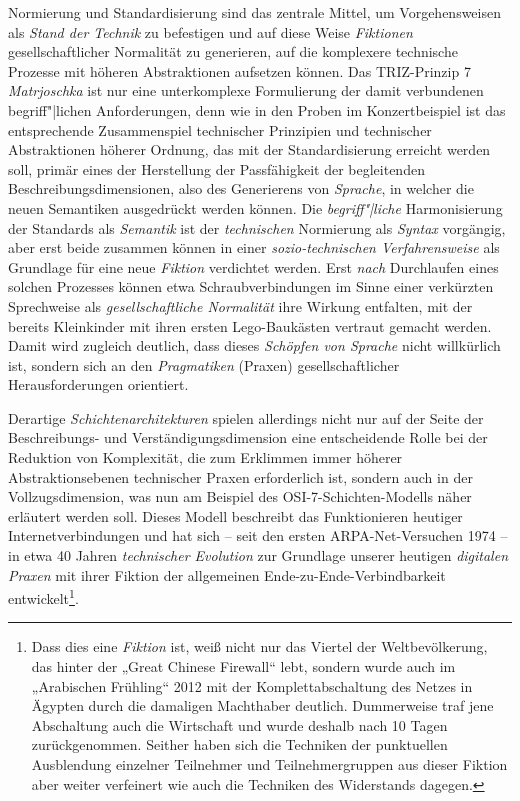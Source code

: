 \documentclass[11pt,a4paper]{article}
\begin{document}
Normierung und Standardisierung sind das zentrale Mittel, um Vorgehensweisen
als \emph{Stand der Technik} zu befestigen und auf diese Weise
\emph{Fiktionen} gesellschaftlicher Normalität zu generieren, auf die
komplexere technische Prozesse mit höheren Abstraktionen aufsetzen können. Das
TRIZ-Prinzip 7 \emph{Matrjoschka} ist nur eine unterkomplexe Formulierung der
damit verbundenen begriff"|lichen Anforderungen, denn wie in den Proben im
Konzertbeispiel ist das entsprechende Zusammenspiel technischer Prinzipien und
technischer Abstraktionen höherer Ordnung, das mit der Standardisierung
erreicht werden soll, primär eines der Herstellung der Passfähigkeit der
begleitenden Beschreibungsdimensionen, also des Generierens von
\emph{Sprache}, in welcher die neuen Semantiken ausgedrückt werden können. Die
\emph{begriff"|liche} Harmonisierung der Standards als \emph{Semantik} ist der
\emph{technischen} Normierung als \emph{Syntax} vorgängig, aber erst beide
zusammen können in einer \emph{sozio-technischen Verfahrensweise} als
Grundlage für eine neue \emph{Fiktion} verdichtet werden. Erst \emph{nach}
Durchlaufen eines solchen Prozesses können etwa Schraubverbindungen im Sinne
einer verkürzten Sprechweise als \emph{gesellschaftliche Normalität} ihre
Wirkung entfalten, mit der bereits Kleinkinder mit ihren ersten Lego-Baukästen
vertraut gemacht werden.  Damit wird zugleich deutlich, dass dieses
\emph{Schöpfen von Sprache} nicht willkürlich ist, sondern sich an den
\emph{Pragmatiken} (Praxen) gesellschaftlicher Herausforderungen orientiert.

Derartige \emph{Schichtenarchitekturen} spielen allerdings nicht nur auf der
Seite der Beschreibungs- und Verständigungsdimension eine entscheidende Rolle
bei der Reduktion von Komplexität, die zum Erklimmen immer höherer
Abstraktionsebenen technischer Praxen erforderlich ist, sondern auch in der
Vollzugsdimension, was nun am Beispiel des OSI-7-Schichten-Modells näher
erläutert werden soll. Dieses Modell beschreibt das Funktionieren heutiger
Internetverbindungen und hat sich -- seit den ersten ARPA-Net-Versuchen 1974
-- in etwa 40 Jahren \emph{technischer Evolution} zur Grundlage unserer
heutigen \emph{digitalen Praxen} mit ihrer Fiktion der allgemeinen
Ende-zu-Ende-Verbindbarkeit entwickelt\footnote{Dass dies eine \emph{Fiktion}
  ist, weiß nicht nur das Viertel der Weltbevölkerung, das hinter der „Great
  Chinese Firewall“ lebt, sondern wurde auch im „Arabischen Frühling“ 2012 mit
  der Komplettabschaltung des Netzes in Ägypten durch die damaligen Machthaber
  deutlich. Dummerweise traf jene Abschaltung auch die Wirtschaft und wurde
  deshalb nach 10 Tagen zurückgenommen. Seither haben sich die Techniken der
  punktuellen Ausblendung einzelner Teilnehmer und Teilnehmergruppen aus
  dieser Fiktion aber weiter verfeinert wie auch die Techniken des Widerstands
  dagegen.}.
\end{document}

